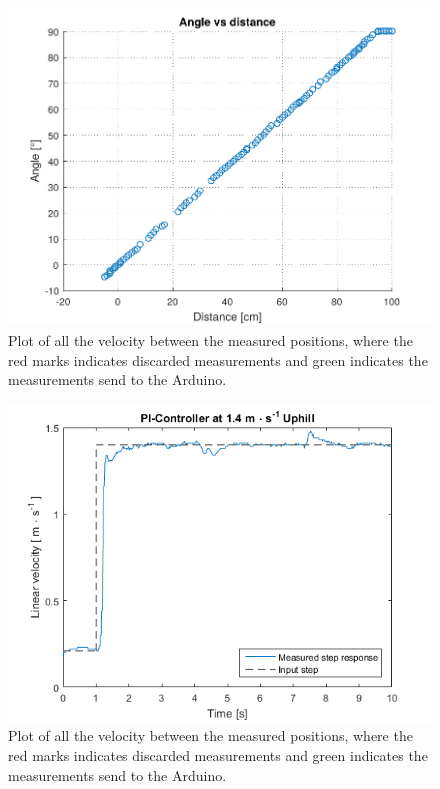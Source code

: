 \begin{figure}[H]
  \centering
	\includegraphics[scale=0.8]{figures/AccTest7.pdf}
	\caption{Plot of all the velocity between the measured positions, where the red marks indicates discarded measurements and green indicates the measurements send to the Arduino.}
	\label{AccT7fig}
\end{figure}

\begin{figure}[H]
  \centering
	\includegraphics[scale=0.8]{figures/AccTest8U.png}
	\caption{Plot of all the velocity between the measured positions, where the red marks indicates discarded measurements and green indicates the measurements send to the Arduino.}
	\label{AccT8Ufig}
\end{figure}

